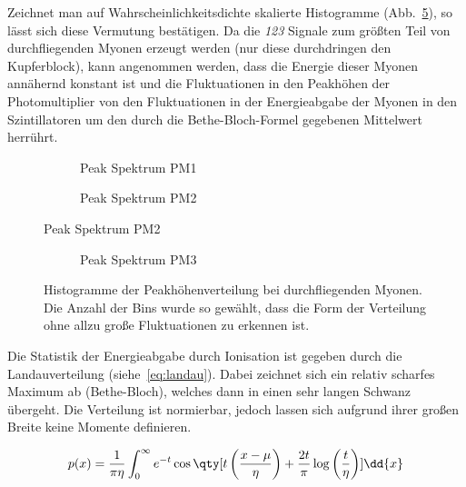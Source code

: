 \documentclass[slug=LM, room=Andreas-Schubert-Bau\,\ K\ 1A, supervisor=Anne-Sophie\ Berthold, coursedate=13.\ 12.\ 2019]{../../Lab_Report_LaTeX/lab_report}
\begin{document}
Zeichnet man auf Wahrscheinlichkeitsdichte skalierte Histogramme
(Abb.~\ref{fig:histos}), so l\"asst sich diese Vermutung best\"atigen.
Da die \textit{123} Signale zum gr\"o\ss{}ten Teil von durchfliegenden
Myonen erzeugt werden (nur diese durchdringen den Kupferblock), kann
angenommen werden, dass die Energie dieser Myonen ann\"ahernd konstant
ist und die Fluktuationen in den Peakh\"ohen der Photomultiplier von
den Fluktuationen in der Energieabgabe der Myonen in den
Szintillatoren um den durch die Bethe-Bloch-Formel gegebenen Mittelwert
herr\"uhrt.

\begin{figure}[h]
  \begin{subfigure}{\textwidth}
    \centering
    
    \caption{Peak Spektrum PM1}
    \label{fig:vorversuch-muon_P1_spec}
  \end{subfigure}

  \begin{subfigure}{\textwidth}
    \centering
    
    \caption{Peak Spektrum PM2}
    \label{fig:vorversuch-muon_P2_spec}
  \end{subfigure}
\end{figure}

\begin{figure}[h]
  \ContinuedFloat
  \centering
  \begin{subfigure}{\textwidth}
    \centering
    
    \caption{Peak Spektrum PM3}
    \label{fig:vorversuch-muon_P3_spec}
  \end{subfigure}

  \caption[Peak Histogramme PM1-3]{Histogramme der
    Peakh\"ohenverteilung bei durchfliegenden Myonen. Die Anzahl der
    Bins wurde so gew\"ahlt, dass die Form der Verteilung ohne allzu
    gro\ss{}e Fluktuationen zu erkennen ist.}
  \label{fig:histos}
\end{figure}

Die Statistik der Energieabgabe durch Ionisation ist gegeben durch die
Landauverteilung (siehe~\ref{eq:landau}).\cite{Landau:216256} Dabei
zeichnet sich ein relativ scharfes Maximum ab (Bethe-Bloch), welches
dann in einen sehr langen Schwanz \"ubergeht. Die Verteilung ist
normierbar, jedoch lassen sich aufgrund ihrer gro\ss{}en Breite keine
Momente definieren.

\begin{equation}
  \label{eq:landau}
  p(x) = {\frac{1}{\pi \eta}}\int _{0}^{\infty }e^{-t}\cos \qty[t\left({\frac {x-\mu }{\eta}}\right)+{\frac {2t}{\pi }}\log \left({\frac {t}{\eta}}\right)]\dd{x}
\end{equation}
\end{document}
